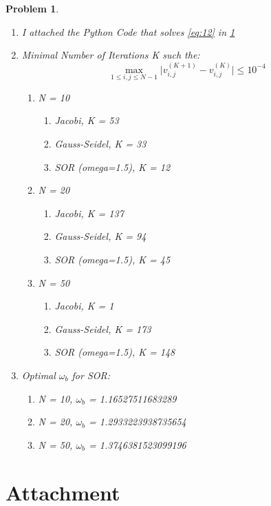 \documentclass[a4paper,12pt]{article}
\newtheorem{prob}{Problem}[]
\begin{document}
\begin{prob}
\begin{enumerate}[label=(\alph*)]
		\item I attached the Python Code that solves \eqref{eq:12} in \ref{code}
		
		\item Minimal Number of Iterations K such the:
		\begin{equation*}
		\max_{1\leq i,j\leq N-1} \Bigg|v_{i,j}^{(K+1)} - v_{i,j}^{(K)}\Bigg| \leq 10^{-4}
		\end{equation*}
		\begin{enumerate}
			\item N = 10
			\begin{enumerate}
				\item Jacobi, K = 53
				\item Gauss-Seidel, K = 33
				\item SOR (omega=1.5), K = 12
			\end{enumerate}
			\item N = 20
			\begin{enumerate}
				\item Jacobi, K = 137
				\item Gauss-Seidel, K = 94
				\item SOR (omega=1.5), K = 45
			\end{enumerate}
			\item N = 50
			\begin{enumerate}
				\item Jacobi, K = 1
				\item Gauss-Seidel, K = 173
				\item SOR (omega=1.5), K = 148
			\end{enumerate}
		\end{enumerate}
		
		\item Optimal $\omega_b$ for SOR:
		\begin{enumerate}
			\item N = 10, $\omega_b$ = 1.16527511683289
			\item N = 20, $\omega_b$ = 1.2933223938735654
			\item N = 50, $\omega_b$ = 1.3746381523099196
		\end{enumerate}
	\end{enumerate}
\end{prob}
\newpage
\section{Attachment}\label{code}

\end{document}
